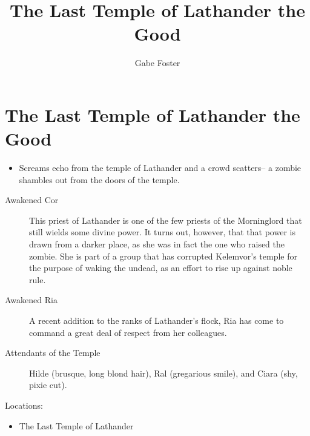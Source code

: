 \documentclass[11pt]{article}
\theoremstyle{definition}
\theoremstyle{remark}
\begin{document}
	\title{The Last Temple of Lathander the Good}
	\date{\vspace{-24pt}}
	\author{Gabe Foster}
	\maketitle

\section{The Last Temple of Lathander the Good}

\begin{description}

\item[Hooks:] 

\begin{itemize}

\item{Screams echo from the temple of Lathander and a crowd scatters-- a zombie shambles out from the doors of the temple.}

\end{itemize}

\item[NPCs:]
\begin{description}

\item[Awakened Cor] This priest of Lathander is one of the few priests of the Morninglord that still wields some divine power.  It turns out, however, that that power is drawn from a darker place, as she was in fact the one who raised the zombie. She is part of a group that has corrupted Kelemvor's temple for the purpose of waking the undead, as an effort to rise up against noble rule. 

\item[Awakened Ria]

A recent addition to the ranks of Lathander's flock, Ria has come to command a great deal of respect from her colleagues.

\item[Attendants of the Temple]
Hilde (brusque, long blond hair), Ral (gregarious smile), and Ciara (shy, pixie cut).  

\end{description}

\item{Locations:}

\begin{itemize}

\item{The Last Temple of Lathander}


\end{itemize}
\end{description}
\end{document}
